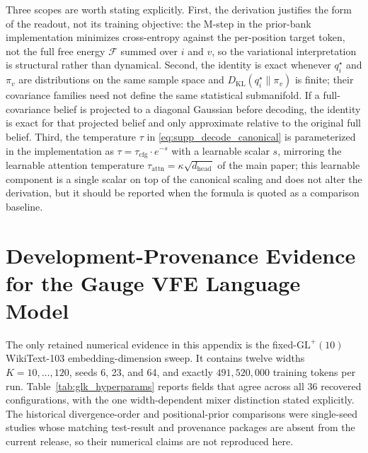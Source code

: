 \documentclass[twoside,11pt]{article}
\begin{document}
Three scopes are worth stating explicitly. First, the derivation justifies the form of the readout, not its training objective: the M-step in the prior-bank implementation minimizes cross-entropy against the per-position target token, not the full free energy $\mathcal{F}$ summed over $i$ and $v$, so the variational interpretation is structural rather than dynamical. Second, the identity is exact whenever $q_i^{\star}$ and $\pi_v$ are distributions on the same sample space and $D_{\mathrm{KL}}(q_i^{\star}\|\pi_v)$ is finite; their covariance families need not define the same statistical submanifold. If a full-covariance belief is projected to a diagonal Gaussian before decoding, the identity is exact for that projected belief and only approximate relative to the original full belief. Third, the temperature $\tau$ in \eqref{eq:supp_decode_canonical} is parameterized in the implementation as $\tau = \tau_{\mathrm{cfg}} \cdot e^{-s}$ with a learnable scalar $s$, mirroring the learnable attention temperature $\tau_{\mathrm{attn}} = \kappa\sqrt{d_{\text{head}}}$ of the main paper; this learnable component is a single scalar on top of the canonical scaling and does not alter the derivation, but it should be reported when the formula is quoted as a comparison baseline.



\section{Development-Provenance Evidence for the Gauge VFE Language Model}
\label{app:vfe3_ablations}

The only retained numerical evidence in this appendix is the fixed-$\mathrm{GL}^+(10)$ WikiText-103 embedding-dimension sweep. It contains twelve widths $K=10,\ldots,120$, seeds 6, 23, and 64, and exactly $491{,}520{,}000$ training tokens per run. Table~\ref{tab:glk_hyperparams} reports fields that agree across all 36 recovered configurations, with the one width-dependent mixer distinction stated explicitly. The historical divergence-order and positional-prior comparisons were single-seed studies whose matching test-result and provenance packages are absent from the current release, so their numerical claims are not reproduced here.
\end{document}
